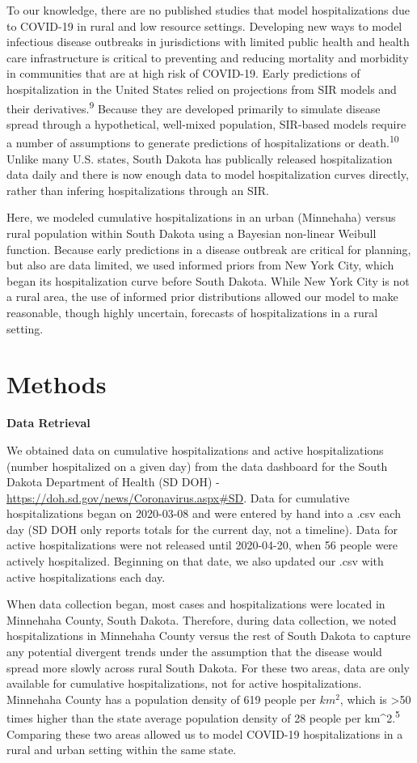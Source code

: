 \documentclass[
]{article}
\begin{document}
To our knowledge, there are no published studies that model hospitalizations due to COVID-19 in rural and low resource settings. Developing new ways to model infectious disease outbreaks in jurisdictions with limited public health and health care infrastructure is critical to preventing and reducing mortality and morbidity in communities that are at high risk of COVID-19. Early predictions of hospitalization in the United States relied on projections from SIR models and their derivatives.\textsuperscript{9} Because they are developed primarily to simulate disease spread through a hypothetical, well-mixed population, SIR-based models require a number of assumptions to generate predictions of hospitalizations or death.\textsuperscript{10} Unlike many U.S. states, South Dakota has publically released hospitalization data daily and there is now enough data to model hospitalization curves directly, rather than infering hospitalizations through an SIR.

Here, we modeled cumulative hospitalizations in an urban (Minnehaha) versus rural population within South Dakota using a Bayesian non-linear Weibull function. Because early predictions in a disease outbreak are critical for planning, but also are data limited, we used informed priors from New York City, which began its hospitalization curve before South Dakota. While New York City is not a rural area, the use of informed prior distributions allowed our model to make reasonable, though highly uncertain, forecasts of hospitalizations in a rural setting.

\hypertarget{methods}{%
\section{Methods}\label{methods}}

\textbf{Data Retrieval}

We obtained data on cumulative hospitalizations and active hospitalizations (number hospitalized on a given day) from the data dashboard for the South Dakota Department of Health (SD DOH) - \url{https://doh.sd.gov/news/Coronavirus.aspx\#SD}. Data for cumulative hospitalizations began on 2020-03-08 and were entered by hand into a .csv each day (SD DOH only reports totals for the current day, not a timeline). Data for active hospitalizations were not released until 2020-04-20, when 56 people were actively hospitalized. Beginning on that date, we also updated our .csv with active hospitalizations each day.

When data collection began, most cases and hospitalizations were located in Minnehaha County, South Dakota. Therefore, during data collection, we noted hospitalizations in Minnehaha County versus the rest of South Dakota to capture any potential divergent trends under the assumption that the disease would spread more slowly across rural South Dakota. For these two areas, data are only available for cumulative hospitalizations, not for active hospitalizations. Minnehaha County has a population density of 619 people per \(km^2\), which is \textgreater50 times higher than the state average population density of 28 people per km\^{}2.\textsuperscript{5} Comparing these two areas allowed us to model COVID-19 hospitalizations in a rural and urban setting within the same state.
\end{document}
